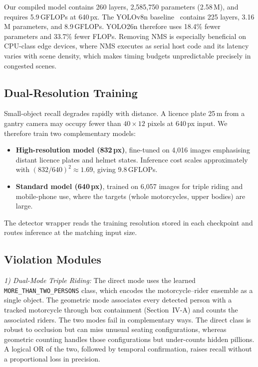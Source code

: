 \documentclass[conference]{IEEEtran}
\begin{document}
Our compiled model contains 260 layers, 2{,}585{,}750 parameters (2.58\,M), and requires 5.9\,GFLOPs at 640\,px. The YOLOv8n baseline~\cite{jocher2023yolov8} contains 225 layers, 3.16\,M parameters, and 8.9\,GFLOPs. YOLO26n therefore uses 18.4\% fewer parameters and 33.7\% fewer FLOPs. Removing NMS is especially beneficial on CPU-class edge devices, where NMS executes as serial host code and its latency varies with scene density, which makes timing budgets unpredictable precisely in congested scenes.

\subsection{Dual-Resolution Training}
Small-object recall degrades rapidly with distance. A licence plate 25\,m from a gantry camera may occupy fewer than $40{\times}12$ pixels at 640\,px input. We therefore train two complementary models:
\begin{itemize}
\item \textbf{High-resolution model (832\,px)}, fine-tuned on 4{,}016 images emphasising distant licence plates and helmet states. Inference cost scales approximately with $(832/640)^2 \approx 1.69$, giving 9.8\,GFLOPs.
\item \textbf{Standard model (640\,px)}, trained on 6{,}057 images for triple riding and mobile-phone use, where the targets (whole motorcycles, upper bodies) are large.
\end{itemize}
The detector wrapper reads the training resolution stored in each checkpoint and routes inference at the matching input size.

\subsection{Violation Modules}

\textit{1) Dual-Mode Triple Riding:} The direct mode uses the learned \texttt{MORE\_THAN\_TWO\_PERSONS} class, which encodes the motorcycle--rider ensemble as a single object. The geometric mode associates every detected person with a tracked motorcycle through box containment (Section~IV-A) and counts the associated riders. The two modes fail in complementary ways. The direct class is robust to occlusion but can miss unusual seating configurations, whereas geometric counting handles those configurations but under-counts hidden pillions. A logical OR of the two, followed by temporal confirmation, raises recall without a proportional loss in precision.
\end{document}
